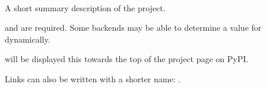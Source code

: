 \documentclass[letterpaper,10pt,english]{sphinxmanual}
\begin{document}

\begin{fulllineitems}
\label{\detokenize{index:tconf-description}}~
\vspace{-45px}

\begin{DUlineblock}{0em}
\item[]  
\item[]  
\item[]  
\end{DUlineblock}

\vspace{-25px}

A short summary description of the project.

\end{fulllineitems}


{\hyperref[\detokenize{index:tconf-project.name}]{}} and {\hyperref[\detokenize{index:tconf-project.version}]{}} are required.
Some backends may be able to determine a value for {\hyperref[\detokenize{index:tconf-project.version}]{}} dynamically.

{\hyperref[\detokenize{index:tconf-description}]{}} will be displayed this towards the top of the project page on PyPI.

Links can also be written with a shorter name: {\hyperref[\detokenize{index:tconf-project.name}]{}}.
\end{document}
